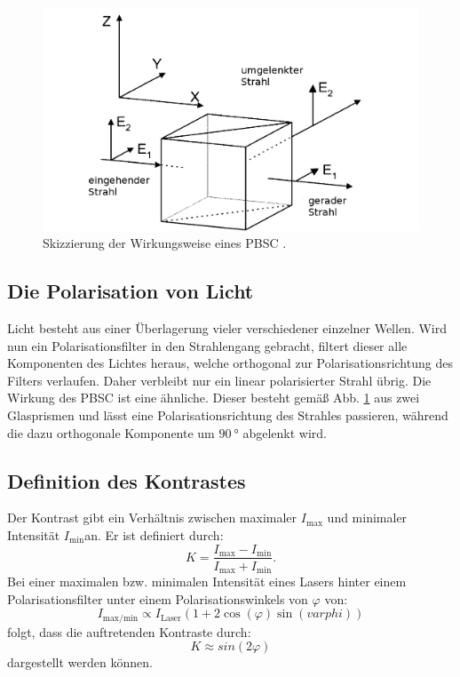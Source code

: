\begin{figure}
	\centering
	\includegraphics[width=\linewidth-100pt,height=\textheight-100pt,keepaspectratio]{content/Bilder/PBSC.png}
	\caption{Skizzierung der Wirkungsweise eines PBSC \cite{V64}.}
	\label{fig:PBSC}
\end{figure}


\subsection{Die Polarisation von Licht}
Licht besteht aus einer Überlagerung vieler verschiedener einzelner Wellen. Wird nun ein Polarisationsfilter in den Strahlengang gebracht, filtert dieser alle Komponenten des Lichtes heraus, welche orthogonal zur Polarisationsrichtung des Filters verlaufen. Daher verbleibt nur ein linear polarisierter Strahl übrig. Die Wirkung des PBSC ist eine ähnliche. Dieser besteht gemäß Abb. \ref{fig:PBSC} aus zwei Glasprismen und lässt eine Polarisationsrichtung des Strahles passieren, während die dazu orthogonale Komponente um $\SI{90}{\degree}$ abgelenkt wird.

\subsection{Definition des Kontrastes}
Der Kontrast gibt ein Verhältnis zwischen maximaler $I_\text{max}$ und minimaler Intensität $I_\text{min}$an. Er ist definiert durch:
\begin{equation}
    K = \frac{I_\text{max} - I_\text{min}}{I_\text{max} + I_\text{min}} \text{.}          \label{eq:kont}
\end{equation}
Bei einer maximalen bzw. minimalen Intensität eines Lasers hinter einem Polarisationsfilter unter einem Polarisationswinkels von $\varphi$ von:
\begin{equation}
	I_\text{max/min} \propto I_\text{Laser} \left(  1+ 2 \cos(\varphi) \sin(varphi) \right) \label{eq:I}
\end{equation}
folgt, dass die auftretenden Kontraste durch:
\begin{equation}
	K \approx sin(2 \varphi) \label{eq:kontrast}
\end{equation}
dargestellt werden können.